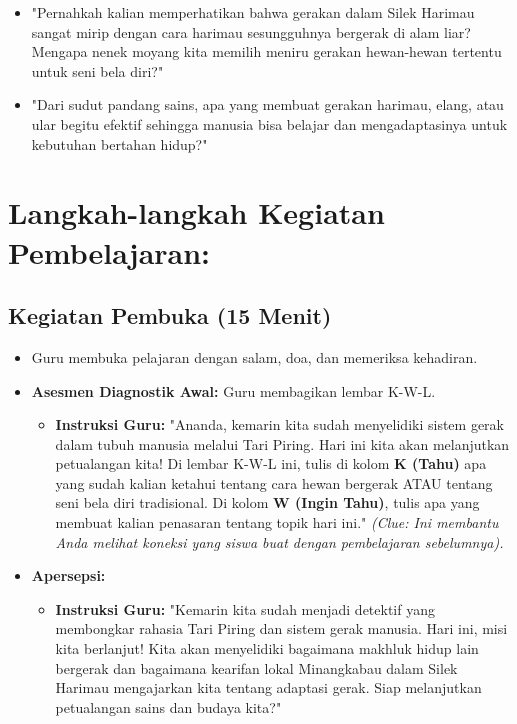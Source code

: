 \documentclass[a4paper,12pt]{article}
\begin{document}
\begin{itemize}
\item "Pernahkah kalian memperhatikan bahwa gerakan dalam Silek Harimau sangat mirip dengan cara harimau sesungguhnya bergerak di alam liar? Mengapa nenek moyang kita memilih meniru gerakan hewan-hewan tertentu untuk seni bela diri?"
\item "Dari sudut pandang sains, apa yang membuat gerakan harimau, elang, atau ular begitu efektif sehingga manusia bisa belajar dan mengadaptasinya untuk kebutuhan bertahan hidup?"
\end{itemize}

\section{Langkah-langkah Kegiatan Pembelajaran:}

\subsection{Kegiatan Pembuka (15 Menit)}
\begin{itemize}
\item Guru membuka pelajaran dengan salam, doa, dan memeriksa kehadiran.
\item \textbf{Asesmen Diagnostik Awal:} Guru membagikan lembar K-W-L.
    \begin{itemize}
    \item \textbf{Instruksi Guru:} "Ananda, kemarin kita sudah menyelidiki sistem gerak dalam tubuh manusia melalui Tari Piring. Hari ini kita akan melanjutkan petualangan kita! Di lembar K-W-L ini, tulis di kolom \textbf{K (Tahu)} apa yang sudah kalian ketahui tentang cara hewan bergerak ATAU tentang seni bela diri tradisional. Di kolom \textbf{W (Ingin Tahu)}, tulis apa yang membuat kalian penasaran tentang topik hari ini." \textit{(Clue: Ini membantu Anda melihat koneksi yang siswa buat dengan pembelajaran sebelumnya).}
    \end{itemize}
\item \textbf{Apersepsi:}
    \begin{itemize}
    \item \textbf{Instruksi Guru:} "Kemarin kita sudah menjadi detektif yang membongkar rahasia Tari Piring dan sistem gerak manusia. Hari ini, misi kita berlanjut! Kita akan menyelidiki bagaimana makhluk hidup lain bergerak dan bagaimana kearifan lokal Minangkabau dalam Silek Harimau mengajarkan kita tentang adaptasi gerak. Siap melanjutkan petualangan sains dan budaya kita?"
    \end{itemize}
\end{itemize}
\end{document}
